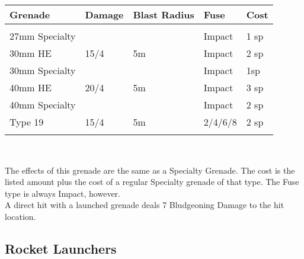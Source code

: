 \documentclass[a4paper, twocolumn, openany]{book}
\begin{document}
{{{	\begin{tabular}{lllll}
	Grenade & Damage & Blast Radius & Fuse & Cost \\ \hline \\
	27mm Specialty 	& \dag 	& \dag 	& Impact 	& 1 sp 		\\
	30mm HE 		& 15/4 	& 5m 	& Impact 	& 2 sp 		\\
	30mm Specialty 	& \dag 	& \dag 	& Impact 	& 1sp \dag 	\\
	40mm HE 		& 20/4 	& 5m 	& Impact 	& 3 sp 		\\
	40mm Specialty 	& \dag 	& \dag 	& Impact 	& 2 sp \dag \\
	Type 19 		& 15/4 	& 5m 	& 2/4/6/8 	& 2 sp 		\\
	\\ \hline
	\end{tabular}\\ }
	\dag The effects of this grenade are the same as a Specialty Grenade. The cost is the listed amount
	plus the cost of a regular Specialty grenade of that type. The Fuse type is always Impact,
	however.\\
	A direct hit with a launched grenade deals 7 Bludgeoning Damage to the hit location.\\
	\vspace{1cm}

	\subsection{Rocket Launchers}

	}}
\end{document}
